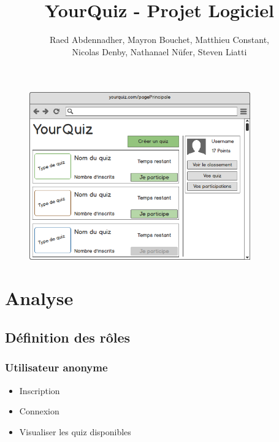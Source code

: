 \documentclass[a4paper, 12pt]{article}
\begin{document}
\title{YourQuiz - Projet Logiciel}
\author{Raed Abdennadher, Mayron Bouchet, Matthieu Constant, \\ Nicolas Denby, Nathanael Nüfer, Steven Liatti}
\maketitle

\begin{figure}
	\begin{center}
		\includegraphics[width=0.85\textwidth]{../mockups/png/mainPage.png}
	\end{center}
\end{figure}
\newpage

\tableofcontents
\listoffigures

\newpage

\section{Analyse}
\subsection{Définition des rôles}
\subsubsection{Utilisateur anonyme}
\begin{itemize}
    \item Inscription
    \item Connexion
    \item Visualiser les quiz disponibles
\end{itemize}
\end{document}
